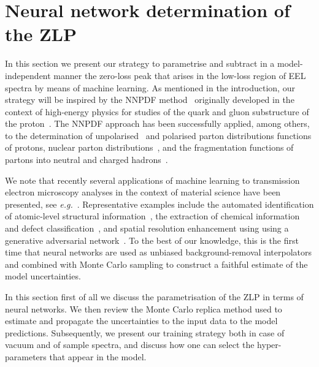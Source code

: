 \section{Neural network determination of the ZLP}
\label{sec:methodology}

In this section we present our strategy to parametrise and subtract in a model-independent manner
the zero-loss peak that arises in the low-loss region of EEL spectra by means
of machine learning.
%
As mentioned in the introduction, our strategy will be inspired by the 
NNPDF method~\cite{Rojo:2018qdd} originally developed in the context of high-energy physics
for studies of the quark and gluon substructure of the proton~\cite{Gao:2017yyd}.
%
The NNPDF approach has been successfully applied, among others, to
the determination of
unpolarised~\cite{DelDebbio:2007ee,Ball:2008by,Ball:2012cx,Ball:2014uwa,Ball:2017nwa}
and polarised parton distributions functions of protons,  nuclear
parton distributions~\cite{AbdulKhalek:2019mzd,AbdulKhalek:2020yuc}, and the
fragmentation functions of partons into neutral and charged
hadrons~\cite{Bertone:2017tyb,Bertone:2018ecm}.

We note that recently several applications of machine learning
to transmission electron microscopy analyses 
in the context of material science have been
presented, see {\it e.g.}~\cite{Gordon:2020, Zhang:2019, Jany:2017, Ziatdinov:2017,10.1145/2834892.2834896,doi:10.1021/acsnano.7b07504,cite-key}.
%
Representative examples
include the automated identification
of atomic-level structural information~\cite{10.1145/2834892.2834896},
the extraction of chemical information
and defect classification~\cite{doi:10.1021/acsnano.7b07504},
and spatial resolution enhancement
using  using a generative adversarial network~\cite{cite-key}.
%
To the best of our knowledge, this is
the first time that neural networks are used as 
 unbiased
 background-removal interpolators
 and combined with Monte Carlo sampling to construct a faithful estimate
of the model uncertainties.

In this section
first of all we discuss the parametrisation of the ZLP in terms of neural networks.
%
We then review the Monte Carlo replica method used to estimate and propagate the
uncertainties to the input data to the model predictions.
%
Subsequently, we present our training strategy both in case of vacuum and of sample spectra,
and discuss how one can select the hyper-parameters that appear in the model.

